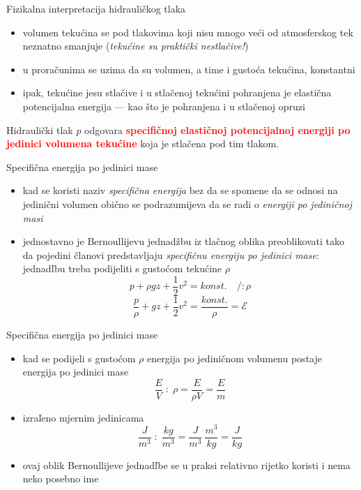 \documentclass[croatian]{beamer}
\begin{document}
\begin{frame}{Fizikalna interpretacija hidrauličkog tlaka}

\begin{itemize}
\item volumen tekućina se pod tlakovima koji nisu mnogo veći od atmosferskog
tek neznatno smanjuje (\emph{tekućine su praktički nestlačive!})
\item u proračunima se uzima da su volumen, a time i gustoća tekućina, konstantni
\item ipak, tekućine jesu stlačive i u stlačenoj tekućini pohranjena je
elastična potencijalna energija --- kao što je pohranjena i u stlačenoj
opruzi
\end{itemize}

\begin{block}{}
Hidraulički tlak $p$ odgovara \textbf{\textcolor{red}{specifičnoj
elastičnoj potencijalnoj energiji po jedinici volumena tekućine}}
koja je stlačena pod tim tlakom.
\end{block}
\end{frame}

\begin{frame}{Specifična energija po jedinici mase}

\begin{itemize}
\item kad se koristi naziv \emph{specifična energija} bez da se spomene
da se odnosi na jedinični volumen obično se podrazumijeva da se radi
o \emph{energiji po jediničnoj masi}
\item jednostavno je Bernoullijevu jednadžbu iz tlačnog oblika preoblikovati
tako da pojedini članovi predstavljaju \emph{specifičnu energiju po
jedinici mase}: jednadľbu treba podijeliti s gustoćom tekućine $\rho$
\[
p+\rho gz+\frac{1}{2}v^{2}=konst.\quad/:\rho
\]
\[
\frac{p}{\rho}+gz+\frac{1}{2}v^{2}=\frac{konst.}{\rho}=\mathcal{E}
\]
\end{itemize}
\end{frame}

\begin{frame}{Specifična energija po jedinici mase}

\begin{itemize}
\item kad se podijeli s gustoćom $\rho$ energija po jediničnom volumenu
postaje energija po jedinici mase
\[
\frac{E}{V}\;:\;\rho=\frac{E}{\rho V}=\frac{E}{m}
\]
\item izraľeno mjernim jedinicama
\[
\frac{J}{m^{3}}\;:\;\frac{kg}{m^{3}}=\frac{J}{m^{3}}\:\frac{m^{3}}{kg}=\frac{J}{kg}
\]
\item ovaj oblik Bernoullijeve jednadľbe se u praksi relativno rijetko koristi
i nema neko posebno ime
\end{itemize}
\end{frame}
\end{document}
